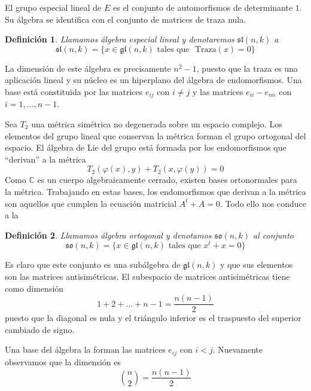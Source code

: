 \documentclass[a4paper,draft,12pt]{scrartcl}
\newtheorem{defi}{Definición}[section]%
\newcommand{\C}{\mathbb{C}}%
\newcommand{\df}[1]{\textsf{\color{blue}#1}}
\begin{document}
\bigskip

El grupo especial lineal de $E$ es el conjunto de automorfismos de determinante $1$.  Su álgebra se identifica con el conjunto de matrices de traza nula.

\begin{defi}

Llamamos  \df{álgebra especial lineal}  y denotaremos $\mathfrak{sl}(n,k)$ a
$$
\mathfrak{sl}(n,k)=\{ x \in \mathfrak{gl}(n,k) \text{ tales que } \text{ Traza}(x)=0\}
$$

\end{defi}

La dimensión de este álgebra es precisamente $n^2 -1$, puesto que la traza es una aplicación lineal y su núcleo es un hiperplano del álgebra de endomorfismos.  Una base está constituida por las matrices $e_{ij}$ con $i \neq j$ y las matrices $e_{ii}-e_{nn}$ con $i= 1, \dots, n-1$.

\bigskip

Sea $T_2$ una métrica simétrica no degenerada sobre un espacio complejo.  Los elementos del grupo lineal que conservan la métrica forman el grupo ortogonal del espacio.  El álgebra de Lie del grupo está formada por los endomorfismos que ``derivan'' a la métrica
$$
T_2(\varphi(x), y)+ T_2(x, \varphi(y))=0
$$
Como $\C$ es un cuerpo algebraicamente cerrado, existen bases ortonormales para la métrica.  Trabajando en estas bases, los endomorfismos que derivan a la métrica
son aquellos que cumplen la ecuación matricial $A^t+A=0$.  Todo ello nos conduce a la 

\begin{defi}

Llamamos  \df{álgebra ortogonal}  y denotamos $\mathfrak{so}(n,k)$ al conjunto
$$
\mathfrak{so}(n,k) = \{ x \in \mathfrak{gl}(n,k) \text{ tales que } x^t+x=0\}
$$

\end{defi}

Es claro que este conjunto es una subálgebra de $\mathfrak{gl}(n,k)$ y que sus elementos son las matrices antisimétricas.  El subespacio de matrices antisimétricas tiene como dimensión
$$1+2+ \dots+ n-1= \frac{n(n-1)}{2}
$$
puesto que la diagonal es nula y el triángulo inferior es el traspuesto del superior cambiado de signo.

Una base del álgebra la forman las matrices $e_{ij}$ con $i <j$. Nuevamente observamos que la dimensión es 
$$
\binom{n}{2}= \frac{n(n-1)}{2}
$$
\bigskip
\end{document}

